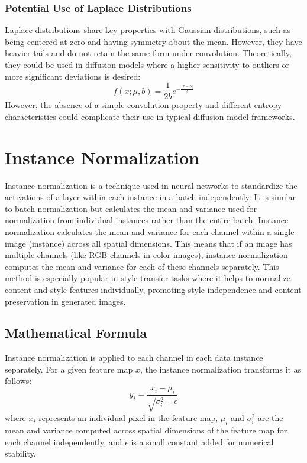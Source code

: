 \documentclass[12pt]{article}
\begin{document}
\subsubsection*{Potential Use of Laplace Distributions}
Laplace distributions share key properties with Gaussian distributions, such as being centered at zero and having symmetry about the mean. However, they have heavier tails and do not retain the same form under convolution. Theoretically, they could be used in diffusion models where a higher sensitivity to outliers or more significant deviations is desired:
\[
f(x; \mu, b) = \frac{1}{2b} e^{-\frac{|x-\mu|}{b}}
\]
However, the absence of a simple convolution property and different entropy characteristics could complicate their use in typical diffusion model frameworks.

\section{Instance Normalization}

Instance normalization is a technique used in neural networks to standardize the activations of a layer within each instance in a batch independently. It is similar to batch normalization but calculates the mean and variance used for normalization from individual instances rather than the entire batch. Instance normalization calculates the mean and variance for each channel within a single image (instance) across all spatial dimensions. This means that if an image has multiple channels (like RGB channels in color images), instance normalization computes the mean and variance for each of these channels separately.
This method is especially popular in style transfer tasks where it helps to normalize content and style features individually, promoting style independence and content preservation in generated images.

\subsection{Mathematical Formula}
Instance normalization is applied to each channel in each data instance separately. For a given feature map \(x\), the instance normalization transforms it as follows:
\[
y_i = \frac{x_i - \mu_i}{\sqrt{\sigma_i^2 + \epsilon}}
\]
where \(x_i\) represents an individual pixel in the feature map, \(\mu_i\) and \(\sigma_i^2\) are the mean and variance computed across spatial dimensions of the feature map for each channel independently, and \(\epsilon\) is a small constant added for numerical stability.
\end{document}
